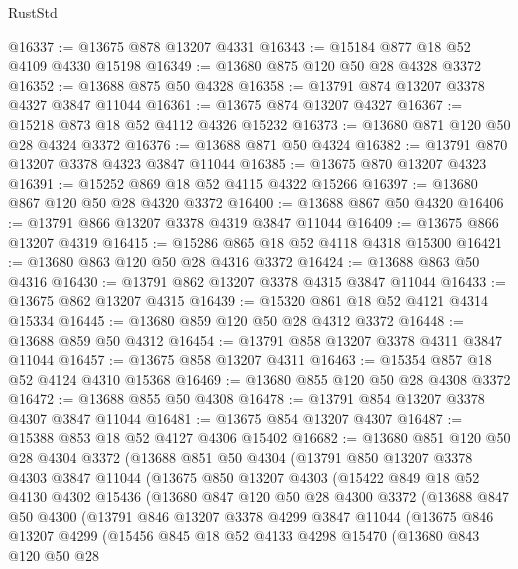 \begin{lexlean}{RustStd}
\begin{coremodule}
@16337 := @13675 @878 @13207 @4331
@16343 := @15184 @877 @18 @52 @4109 @4330 @15198
@16349 := @13680 @875 @120 @50 @28 @4328 @3372
@16352 := @13688 @875 @50 @4328
@16358 := @13791 @874 @13207 @3378 @4327 @3847 @11044
@16361 := @13675 @874 @13207 @4327
@16367 := @15218 @873 @18 @52 @4112 @4326 @15232
@16373 := @13680 @871 @120 @50 @28 @4324 @3372
@16376 := @13688 @871 @50 @4324
@16382 := @13791 @870 @13207 @3378 @4323 @3847 @11044
@16385 := @13675 @870 @13207 @4323
@16391 := @15252 @869 @18 @52 @4115 @4322 @15266
@16397 := @13680 @867 @120 @50 @28 @4320 @3372
@16400 := @13688 @867 @50 @4320
@16406 := @13791 @866 @13207 @3378 @4319 @3847 @11044
@16409 := @13675 @866 @13207 @4319
@16415 := @15286 @865 @18 @52 @4118 @4318 @15300
@16421 := @13680 @863 @120 @50 @28 @4316 @3372
@16424 := @13688 @863 @50 @4316
@16430 := @13791 @862 @13207 @3378 @4315 @3847 @11044
@16433 := @13675 @862 @13207 @4315
@16439 := @15320 @861 @18 @52 @4121 @4314 @15334
@16445 := @13680 @859 @120 @50 @28 @4312 @3372
@16448 := @13688 @859 @50 @4312
@16454 := @13791 @858 @13207 @3378 @4311 @3847 @11044
@16457 := @13675 @858 @13207 @4311
@16463 := @15354 @857 @18 @52 @4124 @4310 @15368
@16469 := @13680 @855 @120 @50 @28 @4308 @3372
@16472 := @13688 @855 @50 @4308
@16478 := @13791 @854 @13207 @3378 @4307 @3847 @11044
@16481 := @13675 @854 @13207 @4307
@16487 := @15388 @853 @18 @52 @4127 @4306 @15402
@16682 := @13680
    @851
    @120
    @50
    @28
    @4304
    @3372
    (@13688
      @851
      @50
      @4304
      (@13791
        @850
        @13207
        @3378
        @4303
        @3847
        @11044
        (@13675
          @850
          @13207
          @4303
          (@15422
            @849
            @18
            @52
            @4130
            @4302
            @15436
            (@13680
              @847
              @120
              @50
              @28
              @4300
              @3372
              (@13688
                @847
                @50
                @4300
                (@13791
                  @846
                  @13207
                  @3378
                  @4299
                  @3847
                  @11044
                  (@13675
                    @846
                    @13207
                    @4299
                    (@15456
                      @845
                      @18
                      @52
                      @4133
                      @4298
                      @15470
                      (@13680
                        @843
                        @120
                        @50
                        @28

\end{coremodule}
\end{lexlean}
